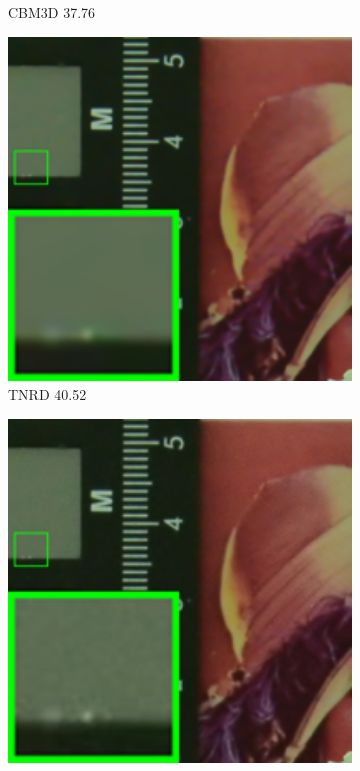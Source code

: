 \begin{figure}
\begin{subfigure}[t]{0.19\textwidth}
		\caption{CBM3D 37.76}
    \end{subfigure}
    \hfill
    \begin{subfigure}[t]{0.19\textwidth}
        \centering
        \includegraphics[width=1\textwidth]{images/mcwnnm/cc/resize_br_TRD_CC15_d800_iso1600_2.png}
\caption{TNRD 40.52}
    \end{subfigure}
    \hfill
    \begin{subfigure}[t]{0.19\textwidth}
        \centering
        \includegraphics[width=1\textwidth]{images/mcwnnm/cc/resize_br_NI_CC15_d800_iso1600_2.png}

\end{subfigure}
\end{figure}
